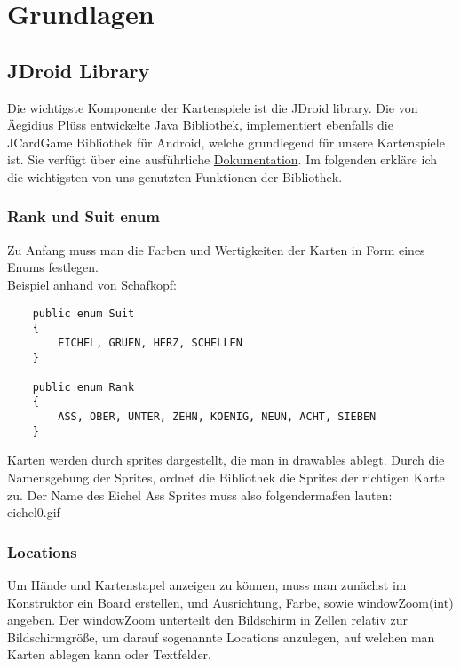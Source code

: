 \chapter{Grundlagen}

\section{JDroid Library}
Die wichtigste Komponente der Kartenspiele ist die JDroid library.
Die von \textcolor{blue}{\href{http://www.aplu.ch/home/apluhomex.jsp?site=99}{Äegidius Plüss}} entwickelte Java Bibliothek, implementiert ebenfalls die JCardGame Bibliothek für Android, welche grundlegend für unsere Kartenspiele ist. Sie verfügt über eine ausführliche \textcolor{blue}{\href{http://www.java-online.ch/gamegrid/index.php?inhalt_links=navigation.inc.php&inhalt_mitte=iframedoc1.html}{Dokumentation}}. Im folgenden erkläre ich die wichtigsten von uns genutzten Funktionen der Bibliothek.

\subsection{Rank und Suit enum}
Zu Anfang muss man die Farben und Wertigkeiten der Karten in Form eines Enums festlegen.\\

Beispiel anhand von Schafkopf:\\

\begin{lstlisting} 
    public enum Suit
    {
        EICHEL, GRUEN, HERZ, SCHELLEN
    }

    public enum Rank
    {
        ASS, OBER, UNTER, ZEHN, KOENIG, NEUN, ACHT, SIEBEN
    }
\end{lstlisting}

Karten werden durch sprites dargestellt, die man in drawables ablegt. Durch die Namensgebung der Sprites, ordnet die Bibliothek die Sprites der richtigen Karte zu.
Der Name des Eichel Ass Sprites muss also folgendermaßen lauten:\\
eichel0.gif\\

\subsection{Locations}
Um Hände und Kartenstapel anzeigen zu können, muss man zunächst im Konstruktor ein Board erstellen, und Ausrichtung, Farbe, sowie windowZoom(int) angeben. Der windowZoom unterteilt den Bildschirm in Zellen relativ zur Bildschirmgröße, um darauf sogenannte Locations anzulegen, auf welchen man Karten ablegen kann oder Textfelder.\\

